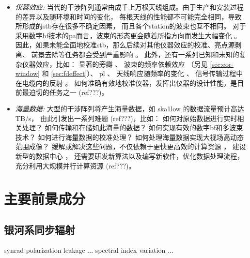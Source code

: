 \begin{itemize}
\item
\emph{仪器效应:}
当代的干涉阵列通常由成千上万根天线组成。由于生产和安装过程的差异以及随环境和时间的变化，
每根天线的性能都不可能完全相同，导致所形成的\acl{stb}存在很多不确定因素，
而且各个\acl{station}的波束也互不相同。
对于采用数字\acl{bf}技术的\acl{pa}而言，波束的形态更会随着所指方向而发生大幅变化
\cite{smirnov2011iii,vanWeeren2016,jagannathan2017}。
因此，如果未能全面地校准\acl{stb}，那么后续对其他仪器效应的校准、亮点源剥离、
前景去除等任务都会受到严重影响 \cite{noordam2004,neben2016}。
此外，还有一系列已知和未知的复杂仪器效应，比如：
显著的旁瓣 \cite{thyagarajan2015,mort2017}、
波束的频率依赖效应 \cite{liu2009ps,datta2010,morales2012}
（另见 \autoref{sec:eor-window} 和 \autoref{sec:fdeffect}）、
\acl{pl} \cite{asad2016,asad2018,lenc2017}、
天线响应随频率的变化 \cite{bernardi2015,trott2017}、
信号传输过程中在电缆内的反射 \cite{beardsley2016}。
如何准确有效地校准仪器，发挥出仪器的设计性能，是目前最迫切的任务之一
\cite{wijnholds2010} (ref???)。

\item
\emph{海量数据:}
大型的干涉阵列将产生海量数据，如 \acs{ska1low} 的数据流量预计高达 TB/s，
由此引发出一系列难题 \cite{norris2011} (ref???)，比如：
如何对原始数据进行实时相关处理？
如何传输和存储如此海量的数据？
如何实现有效的数字\acl{bf}和多波束技术？
如何进行海量数据的校准处理？
如何处理海量数据实现大视场高动态范围成像？
缓解或解决这些问题，不仅依赖于更快更高效的计算资源 \cite{magro2014,vermij2017}，
建设新型的数据中心 \cite{chrysostomou2018}，
还需要研发新算法以及编写新软件，优化数据处理流程，充分利用大规模并行计算资源
\cite{morales2009,gunst2018} (ref???)。

\end{itemize}


\section{主要前景成分}
\label{sec:fg-intro}

\subsection{银河系同步辐射}

\acl{synrad}
polarization leakage ...
spectral index variation ...

